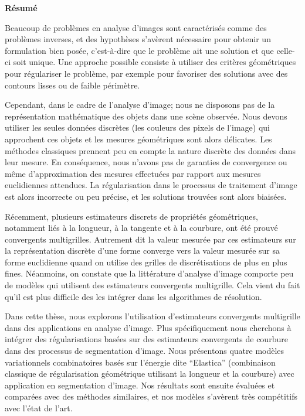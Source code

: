 \begin{center} 
 \textbf{Résumé}
\end{center}

Beaucoup de problèmes en analyse d’images sont caractérisés comme des problèmes inverses, et des hypothèses s'avèrent nécessaire pour obtenir un formulation bien posée, c’est-à-dire que le problème ait une solution et que celle-ci soit unique. Une approche possible consiste à utiliser des critères géométriques pour régulariser le problème, par exemple pour favoriser des solutions avec des contours lisses ou de faible périmètre. 

Cependant, dans le cadre de l’analyse d’image; nous ne disposons pas de la représentation mathématique des objets dans une scène observée. Nous devons utiliser les seules données discrètes (les couleurs des pixels de l’image) qui approchent ces objets et les mesures géométriques sont alors délicates. Les méthodes classiques prennent peu en compte la nature discrète des données dans leur mesure. En conséquence, nous n’avons pas de garanties de convergence ou même d’approximation des mesures effectuées par rapport aux mesures euclidiennes attendues. La régularisation dans le processus de traitement d’image est alors incorrecte ou peu précise, et les solutions trouvées sont alors biaisées.

Récemment, plusieurs estimateurs discrets de propriétés géométriques, notamment liés à la longueur, à la tangente et à la courbure, ont été prouvé convergents multigrilles. Autrement dit la valeur mesurée par ces estimateurs sur la représentation discrète d’une forme converge vers la valeur mesurée sur sa forme euclidienne quand on utilise des grilles de discrétisations de plus en plus fines. Néanmoins, on constate que la littérature d’analyse d’image comporte peu de modèles qui utilisent des estimateurs convergents multigrille. Cela vient du fait qu’il est plus difficile des les intégrer dans les algorithmes de résolution.

Dans cette thèse, nous explorons l’utilisation d’estimateurs convergents multigrille dans des applications en analyse d’image. Plus spécifiquement nous cherchons à intégrer des régularisations basées sur des estimateurs convergents de courbure dans des processus de segmentation d’image. Nous présentons quatre modèles variationnels combinatoires basés sur l’énergie dite “Elastica” (combinaison classique de régularisation géométrique utilisant la longueur et la courbure) avec application en segmentation d’image. Nos résultats sont ensuite évaluées et comparées avec des méthodes similaires, et nos modèles s’avèrent très compétitifs avec l’état de l’art.
